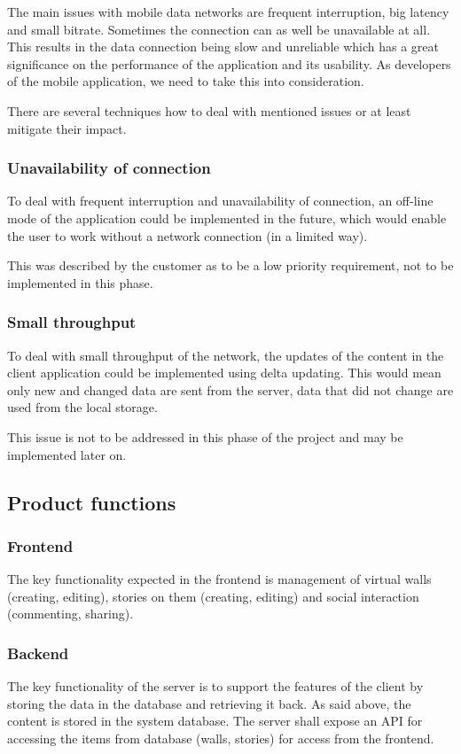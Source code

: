 \documentclass[11pt]{book}
\begin{document}
The main issues with mobile data networks are frequent interruption, big latency and small bitrate. Sometimes the connection can as well be unavailable at all. This results in the data connection being slow and unreliable which has a great significance on the performance of the application and its usability. As developers of the mobile application, we need to take this into consideration.

There are several techniques how to deal with mentioned issues or at least mitigate their impact.

\subsubsection{Unavailability of connection}\label{sec:req_unavailability_of_connection}
To deal with frequent interruption and unavailability of connection, an off-line mode of the application could be implemented in the future, which would enable the user to work without a network connection (in a limited way).

This was described by the customer as to be a low priority requirement, not to be implemented in this phase.

\subsubsection{Small throughput}
To deal with small throughput of the network, the updates of the content in the client application could be implemented using delta updating. This would mean only new and changed data are sent from the server, data that did not change are used from the local storage.

This issue is not to be addressed in this phase of the project and may be implemented later on.

\subsection{Product functions}

\subsubsection{Frontend}
The key functionality expected in the frontend is management of virtual walls (creating, editing), stories on them (creating, editing) and social interaction (commenting, sharing).

\subsubsection{Backend}
The key functionality of the server is to support the features of the client by storing the data in the database and retrieving it back. As said above, the content is stored in the system database. The server shall expose an API for accessing the items from database (walls, stories) for access from the frontend.
\end{document}
